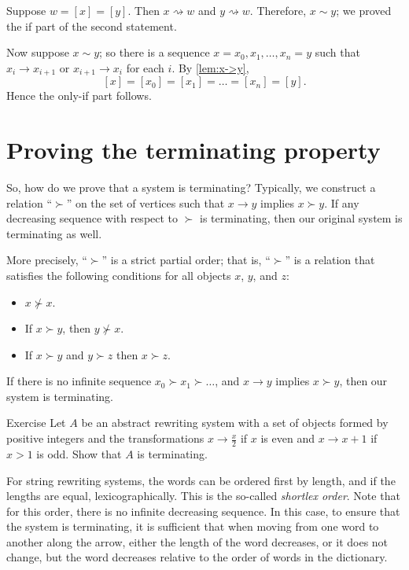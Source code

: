 Suppose $w=[x]=[y]$.
Then $x\rightsquigarrow w$ and $y\rightsquigarrow w$.
Therefore, $x\sim y$;
we proved the if part of the second statement.

Now suppose $x\sim y$;
so there is a sequence $x=x_0,x_1,\dots,x_n=y$ such that $x_i\to x_{i+1}$ or $x_{i+1}\to x_i$ for each $i$.
By \ref{lem:x->y},
\[[x]=[x_0]=[x_1]=\dots=[x_n]=[y].\]
Hence the only-if part follows.
\qeds

\section{Proving the terminating property}

So, how do we prove that a system is terminating?
Typically, we construct a relation ``$\succ$'' on the set of vertices such that 
$x \to y$ implies $x\succ y$.
If any decreasing sequence with respect to $\succ$ is terminating,
then our original system is terminating as well. 

More precisely, ``$\succ$'' is a strict partial order;
that is, ``$\succ$'' is a relation that satisfies the following conditions for all objects $x$, $y$, and $z$:
\begin{itemize}
\item $x\nsucc x$.
\item If $x\succ y$, then  $y\nsucc x$.
\item If $x\succ y$ and $y\succ z$ then  $x\succ z$.
\end{itemize}
If there is no infinite sequence $x_0\succ x_1\succ\dots$,
and $x\to y$ implies $x\succ y$, then our system is terminating.

\begin{thm}{Exercise}\label{ex:x+1}
Let $A$ be an abstract rewriting system
with a set of objects formed by positive integers 
and the transformations $x\to \tfrac x2$ if $x$ is even and $x\to x+1$ if $x>1$ is odd.
Show that $A$ is terminating.
\end{thm}

For string rewriting systems, the words can be ordered first by length, and if the lengths are equal, lexicographically.
This is the so-called \emph{shortlex order}.
Note that for this order, there is no infinite decreasing sequence.
In this case, to ensure that the system is terminating, it is sufficient that when moving from one word to another along the arrow, either the length of the word decreases, or it does not change, but the word decreases relative to the order of words in the dictionary.

